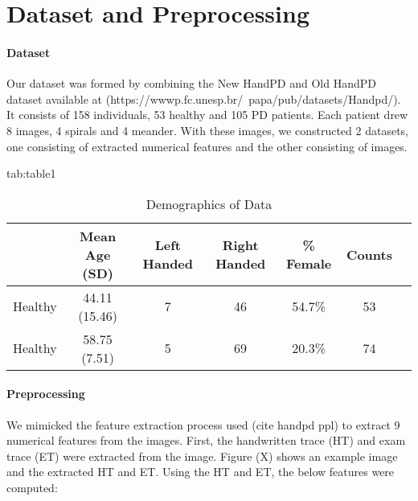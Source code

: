 \documentclass[pmlr,twocolumn,10pt]{jmlr} %
\begin{document}
\section{Dataset and Preprocessing}
\label{sec:Dataset+Preprocessing}

\paragraph{Dataset}
\label{sec:Dataset} Our dataset was formed by combining the New HandPD and Old HandPD dataset available at (https://wwwp.fc.unesp.br/~papa/pub/datasets/Handpd/). It consists of 158 individuals, 53 healthy and 105 PD patients. Each patient drew 8 images, 4 spirals and 4 meander. With these images, we constructed 2 datasets, one consisting of extracted numerical features and the other consisting of images.

\begin{table*}[hbtp]
\centering 
\floatconts
{tab:table1}
{\caption{Demographics of Data}} 
    {
        \begin{tabular}{lcccccc}
        \toprule
        \bfseries & \bfseries Mean Age (SD) & \bfseries Left Handed & \bfseries Right Handed & \bfseries \% Female & \bfseries Counts \\
        \midrule
        Healthy & 44.11 (15.46) & 7 & 46 & 54.7\% & 53 \\
        Healthy & 58.75 (7.51) & 5 & 69 & 20.3\% & 74 \\
        \bottomrule
        \end{tabular}
    }
\end{table*}


\paragraph{Preprocessing}
\label{sec:Preprocessing} 
We mimicked the feature extraction process used (cite handpd ppl) to extract 9 numerical features from the images. First, the handwritten trace (HT) and exam trace (ET) were extracted from the image. Figure (X) shows an example image and the extracted HT and ET.  Using the HT and ET, the below features were computed:
\end{document}
